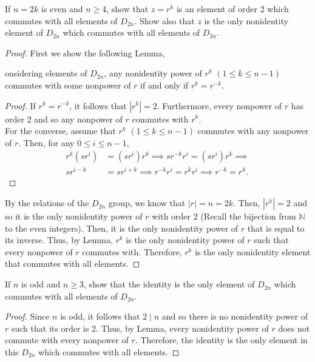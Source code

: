 \documentclass[12pt]{article}
\newcommand{\N}{\mathbb{N}}
\newenvironment{lemma}[2][Lemma]{\begin{trivlist} \item[\hskip \labelsep {\bfseries #1}\hskip \labelsep {\bfseries #2.}]}{\end{trivlist}}
\newenvironment{problem}[2][Problem]{\begin{trivlist} \item[\hskip \labelsep {\bfseries #1}\hskip \labelsep {\bfseries #2.}]}{\end{trivlist}}
\begin{document}
\begin{problem}{4}
  If $n=2k$ is even and $n\geq 4$, show that $z=r^{k}$ is an element of order 2 which commutes with all elements of $D_{2n}$. Show also that $z$ is the only nonidentity element of $D_{2n}$ which commutes with all elements of $D_{2n}$. 
\begin{proof}
  First we show the following Lemma, 
\begin{lemma}
  Considering elements of $D_{2n}$, any nonidentity power of $r^{k}$ $(1\leq k \leq n-1)$ commutes with some nonpower of $r$ if and only if $r^{k}= r^{-k}$.
\begin{proof}
  If $r^{k} = r^{-k}$, it follows that $|r^{k}|=2$. Furthermore, every nonpower of $r$ has order 2 and so any nonpower of $r$ commutes with $r^{k}$.\\
  For the converse, assume that $r^{k}$ $(1\leq k \leq n-1)$ commutes with any nonpower of $r$. Then, for any $0\leq i\leq n-1$,
\begin{align*}
  r^{k}(sr^{i}) &= (sr^{i})r^{k} \implies sr^{-k}r^{i} = (sr^{i})r^{k} \implies\\
  sr^{i-k} &= sr^{i+k} \implies r^{-k}r^{i} = r^{k}r^{i} \implies r^{-k} = r^{k}.
\end{align*}
\end{proof}
\end{lemma}
By the relations of the $D_{2n}$ group, we know that $|r|=n=2k$. Then, $|r^{k}|=2$ and so it is the only nonidentity power of $r$ with order 2 (Recall the bijection from $\N$ to the even integers). Then, it is the only nonidentity power of $r$ that is equal to its inverse.  Thus, by Lemma, $r^{k}$ is the only nonidentity power of $r$ such that every nonpower of $r$ commutes with. Therefore, $r^{k}$ is the only nonidentity element that commutes with all elements.   
\end{proof}
\end{problem}
\begin{problem}{5}
  If $n$ is odd and $n\geq 3$, show that the identity is the only element of $D_{2n}$ which commutes with all elements of $D_{2n}$.
\begin{proof}
  Since $n$ is odd, it follows that $2\mid n$ and so there is no nonidentity power of $r$ such that its order is 2. Thus, by Lemma, every nonidentity power of $r$ does not commute with every nonpower of $r$. Therefore, the identity is the only element in this $D_{2n}$ which commutes with all elements.
\end{proof}
\end{problem}
       
\end{document}
